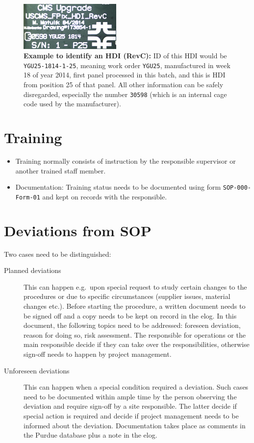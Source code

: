 \documentclass[12pt]{unlsilabsop}
\begin{document}
\begin{figure}[hH]
    \begin{center}
        \includegraphics[width=5cm]{img/HDI_SN.jpg}
        \caption{\textbf{Example to identify an HDI (RevC):} ID of this HDI would be \texttt{YGU25-1814-1-25}, meaning work order \texttt{YGU25}, manufactured in week 18 of year 2014, first panel processed in this batch, and this is HDI from position 25 of that panel. All other information can be safely disregarded, especially the number \texttt{30598} (which is an internal cage code used by the manufacturer).}
        \label{fig:HDI_SN_RevC}
    \end{center}
\end{figure}

\section{Training}
\begin{itemize}
\item Training normally consists of instruction by the responsible supervisor or another trained staff member.
\item Documentation: Training status needs to be documented using form \texttt{SOP-000-Form-01} and kept on records with the responsible.
\end{itemize}

\section{Deviations from SOP}
Two cases need to be distinguished:
\begin{description}
    \item[Planned deviations] This can happen e.g.~upon special request to study certain changes to the procedures or due to specific circumstances (supplier issues, material changes etc.). Before starting the procedure, a written document needs to be signed off and a copy needs to be kept on record in the elog. In this document, the following topics need to be addressed: foreseen deviation, reason for doing so, risk assessment. The responsible for operations or the main responsible decide if they can take over the responsibilities, otherwise sign-off needs to happen by project management.
    \item[Unforeseen deviations] This can happen when a special condition required a deviation. Such cases need to be documented within ample time by the person observing the deviation and require sign-off by a site responsible. The latter decide if special action is required and decide if project management needs to be informed about the deviation. Documentation takes place as comments in the Purdue database plus a note in the elog.
\end{description}
\end{document}
